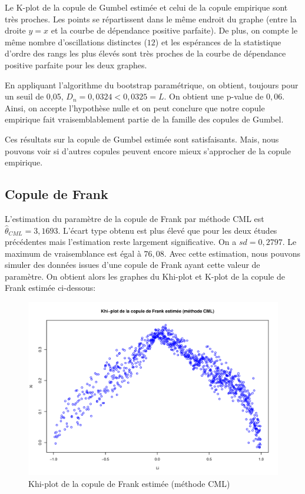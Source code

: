 Le K-plot de la copule de Gumbel estimée et celui de la copule empirique sont très proches. Les points se répartissent dans le même endroit du graphe (entre la droite $y=x$ et la courbe de dépendance positive parfaite). De plus, on compte le même nombre d'oscillations distinctes ($12$) et les espérances de la statistique d'ordre des rangs les plus élevés sont très proches de la courbe de dépendance positive parfaite pour les deux graphes. 

En appliquant l'algorithme du bootstrap paramétrique, on obtient, toujours pour un seuil de 0,05, $D_n = 0,0324 < 0,0325 = L$. On obtient une p-value de $0,06$. Ainsi, on accepte l'hypothèse nulle et on peut conclure que notre copule empirique fait vraisemblablement partie de la famille des copules de Gumbel.

Ces résultats sur la copule de Gumbel estimée sont satisfaisants. Mais, nous pouvons voir si d'autres copules peuvent encore mieux s'approcher de la copule empirique.

\subsection{Copule de Frank}

L'estimation du paramètre de la copule de Frank par méthode CML est $\widehat{\theta}_{CML}=3,1693$. L'écart type obtenu est plus élevé que pour les deux études précédentes mais l'estimation reste largement significative. On a $sd = 0,2797$. Le maximum de vraisemblance est égal à $76,08$. Avec cette estimation, nous pouvons simuler des données issues d'une copule de Frank ayant cette valeur de paramètre. On obtient alors les graphes du Khi-plot et K-plot de la copule de Frank estimée ci-dessous:

\noindent%
\begin{figure}[H]
    \begin{center}
      \includegraphics[width=17 cm, angle=0]{./pictures/frankcmlkhiplot.png}
      \centering\caption{\label{2}Khi-plot de la copule de Frank estimée (méthode CML)}
    \end{center}
\end{figure}

